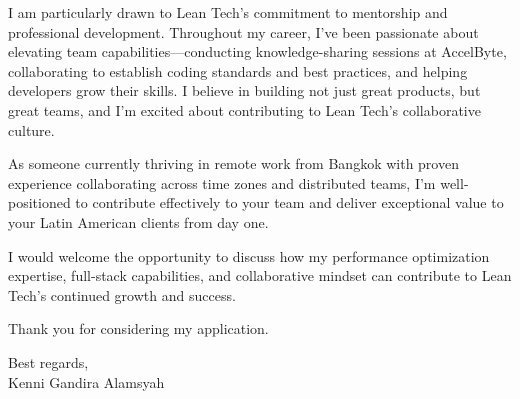 \documentclass[11pt,a4paper]{article}
\begin{document}
I am particularly drawn to Lean Tech's commitment to mentorship and professional development. Throughout my career, I've been passionate about elevating team capabilities---conducting knowledge-sharing sessions at AccelByte, collaborating to establish coding standards and best practices, and helping developers grow their skills. I believe in building not just great products, but great teams, and I'm excited about contributing to Lean Tech's collaborative culture.

\vspace{1em}

As someone currently thriving in remote work from Bangkok with proven experience collaborating across time zones and distributed teams, I'm well-positioned to contribute effectively to your team and deliver exceptional value to your Latin American clients from day one.

\vspace{1em}

I would welcome the opportunity to discuss how my performance optimization expertise, full-stack capabilities, and collaborative mindset can contribute to Lean Tech's continued growth and success.

\vspace{1em}

Thank you for considering my application.

\vspace{1em}

Best regards,\\
Kenni Gandira Alamsyah
\end{document}
